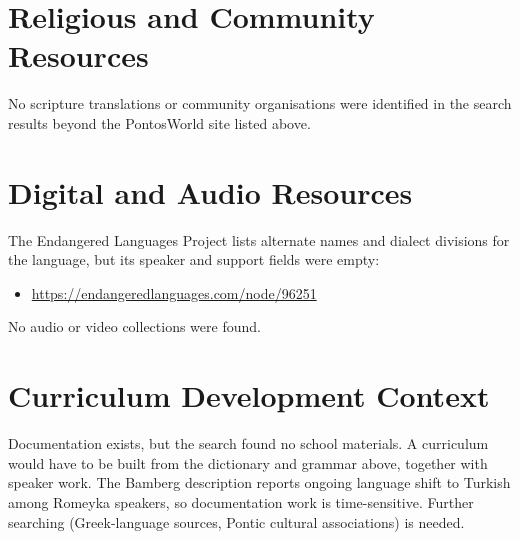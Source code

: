 \documentclass[12pt]{article}
\begin{document}
\section{Religious and Community Resources}
No scripture translations or community organisations were identified in the search results beyond the PontosWorld site listed above.

\section{Digital and Audio Resources}
The Endangered Languages Project lists alternate names and dialect divisions for the language, but its speaker and support fields were empty:
\begin{itemize}
\item \url{https://endangeredlanguages.com/node/96251}
\end{itemize}
No audio or video collections were found.

\section{Curriculum Development Context}
Documentation exists, but the search found no school materials. A curriculum would have to be built from the dictionary and grammar above, together with speaker work. The Bamberg description reports ongoing language shift to Turkish among Romeyka speakers, so documentation work is time-sensitive. Further searching (Greek-language sources, Pontic cultural associations) is needed.
\end{document}
